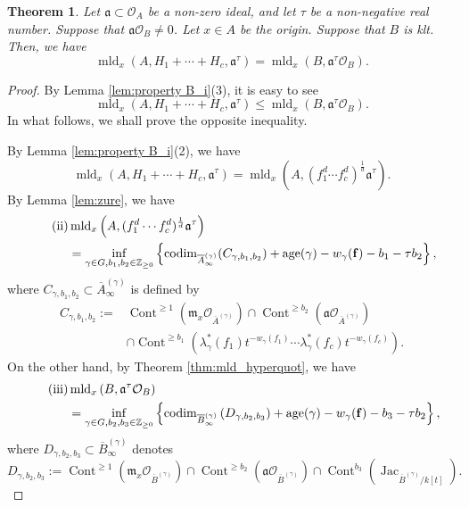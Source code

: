 \documentclass[a4paper,11pt]{amsart}
\newtheorem{thm}{Theorem}[section]
\theoremstyle{definition}
\theoremstyle{remark}
\begin{document}
\begin{thm}\label{thm:PIA}
Let $\mathfrak{a} \subset \mathcal{O}_A$ be a non-zero ideal, 
and let $\tau$ be a non-negative real number. 
Suppose that $\mathfrak{a} \mathcal{O}_B \not = 0$. 
Let $x \in A$ be the origin. 
Suppose that $B$ is klt. 
Then, we have
\[
\operatorname{mld}_x \left(A, H_1 + \cdots + H_c, \mathfrak{a} ^{\tau} \right)
=\operatorname{mld}_x \left( B, \mathfrak{a}^{\tau} \mathcal{O}_B \right). 
\]
\end{thm}

\begin{proof}
By Lemma \ref{lem:property B_i}(3), it is easy to see 
\[
\operatorname{mld}_x \left( A,H_1 + \cdots + H_c, \mathfrak{a} ^{\tau} \right) 
\le \operatorname{mld}_x \left( B, \mathfrak{a}^{\tau} \mathcal{O}_B \right).
\]
In what follows, we shall prove the opposite inequality. 

By Lemma \ref{lem:property B_i}(2), we have 
\[\tag{i}
\operatorname{mld}_x \left( A,H_1 + \cdots + H_c, \mathfrak{a} ^{\tau} \right) 
=
\operatorname{mld}_x \left( A, (f_1 ^d \cdots f_c ^d )^{\frac{1}{d}} \mathfrak{a} ^{\tau} \right). 
\]
By Lemma \ref{lem:zure}, we have
\begin{align*}\tag{ii}
&\operatorname{mld}_x \left( A, (f_1 ^d \cdots f_c ^d )^{\frac{1}{d}} \mathfrak{a} ^{\tau} \right) \\
&= \inf _{\gamma \in G, b_1, b_2 \in \mathbb{Z}_{\ge 0}}
\left \{ 
\operatorname{codim}_{\overline{A}^{(\gamma)}_\infty} (C_{\gamma, b_1, b_2}) + \operatorname{age}(\gamma) - w_{\gamma} ({\bf f}) - b_1 - \tau b_2 
\right \},
\end{align*}
where $C_{\gamma, b_1, b_2} \subset \overline{A}^{(\gamma)} _{\infty}$ is defined by
\begin{align*}
C_{\gamma, b_1, b_2} := {}
&\operatorname{Cont}^{\ge 1} \left(\mathfrak{m}_x \mathcal{O}_{\overline{A}^{(\gamma)}} \right)
\cap
\operatorname{Cont}^{\ge b_2} \left( \mathfrak{a} \mathcal{O}_{\overline{A}^{(\gamma)}} \right) \\
&\cap 
\operatorname{Cont}^{\ge b_1} \left( \lambda ^* _{\gamma}(f_1)t^{-w_\gamma(f_1)}\cdots \lambda ^* _{\gamma}(f_c)t^{-w_\gamma(f_c)} \right). 
\end{align*}
On the other hand, by Theorem \ref{thm:mld_hyperquot}, we have 
\begin{align*}\tag{iii}
&\operatorname{mld}_x \left( B, \mathfrak{a}^{\tau} \mathcal{O}_B \right)\\
&= \inf _{\gamma \in G, b_2, b_3 \in \mathbb{Z}_{\ge 0}}
\left \{ 
\operatorname{codim}_{\overline{B}^{(\gamma)}_\infty} \left( D_{\gamma, b_2, b_3} \right) + \operatorname{age}(\gamma)- w_\gamma({\bf f}) - b_3 - \tau b_2
\right \}, 
\end{align*}
where $D_{\gamma, b_2, b_3} \subset \overline{B}^{(\gamma)} _{\infty}$ denotes
\[
D_{\gamma, b_2, b_3} 
:= 
\operatorname{Cont}^{\ge 1} \left(\mathfrak{m}_x \mathcal{O}_{\overline{B}^{(\gamma)}} \right) \cap
\operatorname{Cont}^{\ge b_2}  \left(\mathfrak{a} \mathcal{O}_{\overline{B}^{(\gamma)}} \right) \cap 
\operatorname{Cont}^{b_3} \left(\operatorname{Jac}_{\overline{B}^{(\gamma)}/k[t]} \right). 
\]


\end{proof}
\end{document}
